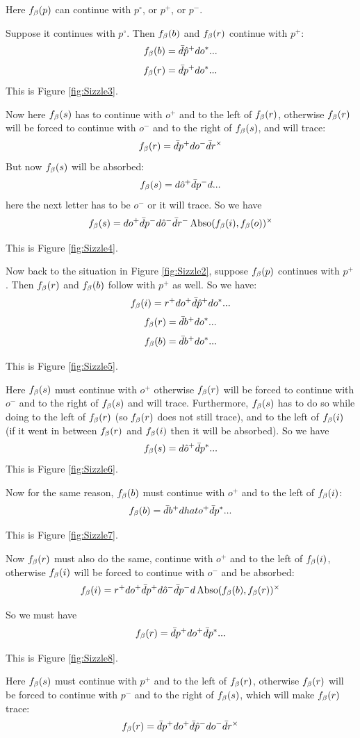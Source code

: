 Here $f_\beta(p)$ can continue with $p^\circ$, or $p^+$, or $p^-$.

Suppose it continues with $p^\circ$. Then $f_\beta(b)$ and $f_\beta(r)$ continue with $p^+$:
\[
f_\beta(b) = \bar{d} \hat{p}^+ d o^*...
\]
\[
f_\beta(r) = \bar{d} p^+ d o^*...
\]
This is Figure \ref{fig:Sizzle3}.

Now here $f_\beta(s)$ has to continue with $o^+$ and to the left of $f_\beta(r)$, otherwise $f_\beta(r)$ will be forced to continue with $o^-$ and to the right of $f_\beta(s)$, and will trace:
\[
f_\beta(r) = \bar{d} p^+ d o^- \bar{d} r^\times
\]
But now $f_\beta(s)$ will be absorbed:
\[
f_\beta(s) = d \hat{o}^+ \bar{d} p^- d... 
\]
here the next letter has to be $o^-$ or it will trace. So we have
\[
f_\beta(s) = d o^+ \bar{d} p^- d \hat{o}^- \bar{d} r^- \operatorname{Abso}(f_\beta(i), f_\beta(o))^\times
\]

This is Figure \ref{fig:Sizzle4}.

Now back to the situation in Figure \ref{fig:Sizzle2}, suppose $f_\beta(p)$ continues with $p^+$. Then $f_\beta(r)$ and $f_\beta(b)$ follow with $p^+$ as well. So we have:
\[
f_\beta(i) = r^+ d o^+ \bar{d} \hat{p}^+ d o^*...
\]
\[
f_\beta(r) = \bar{d} b^+ d o^*...
\]
\[
f_\beta(b) = \bar{d} b^+ d o^*...
\]

This is Figure \ref{fig:Sizzle5}.

Here $f_\beta(s)$ must continue with $o^+$ otherwise $f_\beta(r)$ will be forced to continue with $o^-$ and to the right of $f_\beta(s)$ and will trace. Furthermore, $f_\beta(s)$ has to do so while doing to the left of $f_\beta(r)$ (so $f_\beta(r)$ does not still trace), and to the left of $f_\beta(i)$ (if it went in between $f_\beta(r)$ and $f_\beta(i)$ then it will be absorbed). So we have
\[
f_\beta(s) = d \hat{o}^+ \bar{d} p^*...
\]
This is Figure \ref{fig:Sizzle6}.

Now for the same reason, $f_\beta(b)$ must continue with $o^+$ and to the left of $f_\beta(i)$:
\[
f_\beta(b) = \bar{d} b^+ d hat{o}^+ \bar{d} p^*...
\]

This is Figure \ref{fig:Sizzle7}.

Now $f_\beta(r)$ must also do the same, continue with $o^+$ and to the left of $f_\beta(i)$, otherwise $f_\beta(i)$ will be forced to continue with $o^-$ and be absorbed:
\[
f_\beta(i) = r^+ d o^+ \bar{d} p^+ d \hat{o}^- \bar{d} p^- d \operatorname{Abso}(f_\beta(b), f_\beta(r))^\times
\]

So we must have
\[
f_\beta(r) = \bar{d} p^+ d o^+ \bar{d} p^*...
\]

This is Figure \ref{fig:Sizzle8}.

Here $f_\beta(s)$ must continue with $p^+$ and to the left of $f_\beta(r)$, otherwise $f_\beta(r)$ will be forced to continue with $p^-$ and to the right of $f_\beta(s)$, which will make $f_\beta(r)$ trace:
\[
f_\beta(r) = \bar{d} p^+ d o^+ \bar{d} \hat{p}^- d o^- \bar{d} r^\times
\]


